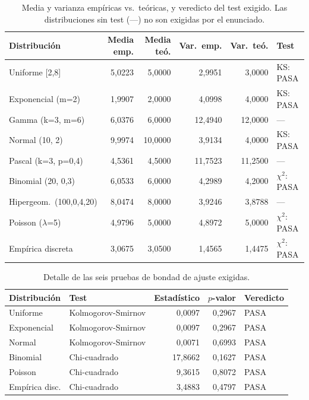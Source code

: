 \documentclass[11pt]{article}
\begin{document}
\begin{table}[H]
\centering
\small
\begin{tabular}{lrrrrl}
\toprule
\textbf{Distribuci\'on} & \textbf{Media emp.} & \textbf{Media te\'o.}
& \textbf{Var.\ emp.} & \textbf{Var.\ te\'o.} & \textbf{Test} \\
\midrule
Uniforme [2,8]       & 5,0223  & 5,0000  & 2,9951  & 3,0000  & KS: PASA \\
Exponencial (m=2)    & 1,9907  & 2,0000  & 4,0998  & 4,0000  & KS: PASA \\
Gamma (k=3, m=6)     & 6,0376  & 6,0000  & 12,4940 & 12,0000 & --- \\
Normal (10, 2)       & 9,9974  & 10,0000 & 3,9134  & 4,0000  & KS: PASA \\
Pascal (k=3, p=0,4)  & 4,5361  & 4,5000  & 11,7523 & 11,2500 & --- \\
Binomial (20, 0,3)   & 6,0533  & 6,0000  & 4,2989  & 4,2000  & $\chi^2$: PASA \\
Hipergeom.\ (100,0,4,20) & 8,0474 & 8,0000 & 3,9246 & 3,8788 & --- \\
Poisson ($\lambda$=5)& 4,9796  & 5,0000  & 4,8972  & 5,0000  & $\chi^2$: PASA \\
Emp\'irica discreta  & 3,0675  & 3,0500  & 1,4565  & 1,4475  & $\chi^2$: PASA \\
\bottomrule
\end{tabular}
\caption{Media y varianza emp\'iricas vs.\ te\'oricas, y veredicto del test
exigido. Las distribuciones sin test (---) no son exigidas por el enunciado.}
\label{tab:resultados}
\end{table}

\begin{table}[H]
\centering
\begin{tabular}{llrrl}
\toprule
\textbf{Distribuci\'on} & \textbf{Test} & \textbf{Estad\'istico}
& \textbf{$p$-valor} & \textbf{Veredicto} \\
\midrule
Uniforme          & Kolmogorov-Smirnov & 0,0097  & 0,2967 & PASA \\
Exponencial       & Kolmogorov-Smirnov & 0,0097  & 0,2967 & PASA \\
Normal            & Kolmogorov-Smirnov & 0,0071  & 0,6993 & PASA \\
Binomial          & Chi-cuadrado       & 17,8662 & 0,1627 & PASA \\
Poisson           & Chi-cuadrado       & 9,3615  & 0,8072 & PASA \\
Emp\'irica disc.  & Chi-cuadrado       & 3,4883  & 0,4797 & PASA \\
\bottomrule
\end{tabular}
\caption{Detalle de las seis pruebas de bondad de ajuste exigidas.}
\label{tab:tests}
\end{table}
\end{document}
